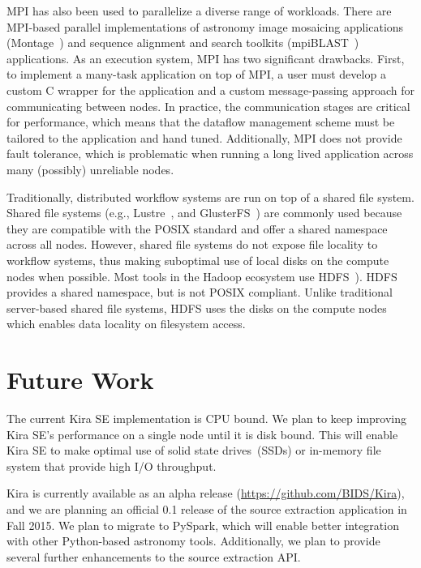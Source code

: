 \documentclass[conference]{IEEEtran}
\begin{document}
MPI has also been used to parallelize a diverse range of workloads. There
are MPI-based parallel implementations of astronomy image
mosaicing applications (Montage~\cite{jacob09}) and
sequence alignment and search toolkits (mpiBLAST~\cite{lin08}) applications. As an
execution system, MPI has two significant drawbacks. First, to implement a many-task
application on top of MPI, a user must develop a custom C wrapper for the application
and a custom message-passing approach for communicating between nodes. In practice, the
communication stages are critical for performance, which means that the
dataflow management scheme must be tailored to the application and hand tuned. Additionally,
MPI does not provide fault tolerance, which is problematic when running a long lived
application across many (possibly) unreliable nodes.

Traditionally, distributed workflow systems are run on top of a shared file system. 
Shared file systems (e.g., Lustre~\cite{donovan03}, and
GlusterFS~\cite{davies13}) are commonly used because they are compatible with the POSIX
standard and offer a shared namespace across all nodes. However, shared file systems
do not expose file locality to workflow systems, thus making suboptimal use of local
disks on the compute nodes when possible. Most tools in the Hadoop ecosystem use
HDFS~\cite{shvachko10}). HDFS  provides a shared namespace, but is not POSIX
compliant. Unlike traditional server-based shared file systems, HDFS uses
the disks on the compute nodes which enables data locality on filesystem access.

\section{Future Work}
\label{sec:Future}

The current Kira SE implementation is CPU bound. We plan to keep improving Kira SE's performance
on a single node until it is disk bound. This will enable Kira SE to make optimal use of
solid state drives~(SSDs) or in-memory file system that provide high I/O throughput.

Kira is currently available as an alpha release (\url{https://github.com/BIDS/Kira}), and we are planning an official 0.1 release
of the source extraction application in Fall 2015.
We plan to migrate to PySpark, which will enable better integration with other
Python-based astronomy tools. Additionally, we plan to provide several further enhancements to
the source extraction API.
\end{document}
